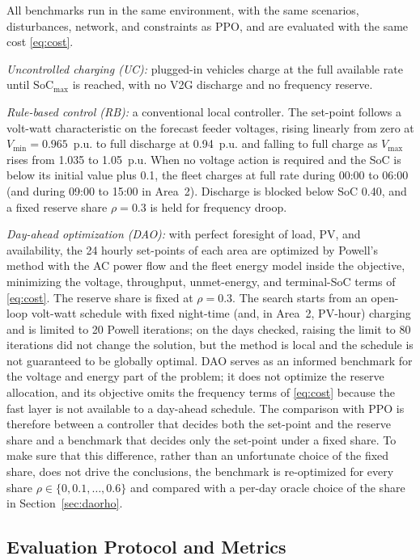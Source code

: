 All benchmarks run in the same environment, with the same scenarios,
disturbances, network, and constraints as PPO, and are evaluated with
the same cost \eqref{eq:cost}.

\emph{Uncontrolled charging (UC):} plugged-in vehicles charge at the
full available rate until $\mathrm{SoC}_{\max}$ is reached, with no V2G
discharge and no frequency reserve.

\emph{Rule-based control (RB):} a conventional local controller. The
set-point follows a volt-watt characteristic on the forecast feeder
voltages, rising linearly from zero at $V_{\min}=0.965$~p.u. to full
discharge at 0.94~p.u. and falling to full charge as $V_{\max}$ rises
from 1.035 to 1.05~p.u. When no voltage action is required and the SoC
is below its initial value plus 0.1, the fleet charges at full rate
during 00:00 to 06:00 (and during 09:00 to 15:00 in Area~2). Discharge
is blocked below SoC 0.40, and a fixed reserve share $\rho=0.3$ is
held for frequency droop.

\emph{Day-ahead optimization (DAO):} with perfect foresight of load,
PV, and availability, the 24 hourly set-points of each area are
optimized by Powell's method with the AC power flow and the fleet
energy model inside the objective, minimizing the voltage, throughput,
unmet-energy, and terminal-SoC terms of \eqref{eq:cost}. The reserve
share is fixed at $\rho=0.3$. The search starts from an open-loop
volt-watt schedule with fixed night-time (and, in Area~2, PV-hour)
charging and is limited to 20 Powell iterations; on the days checked,
raising the limit to 80 iterations did not change the solution, but
the method is local and the schedule is not guaranteed to be globally
optimal. DAO serves as an informed benchmark for the voltage and
energy part of the problem; it does not optimize the reserve
allocation, and its objective omits the frequency terms of
\eqref{eq:cost} because the fast layer is not available to a
day-ahead schedule. The comparison with PPO is therefore between a
controller that decides both the set-point and the reserve share and
a benchmark that decides only the set-point under a fixed share. To
make sure that this difference, rather than an unfortunate choice of
the fixed share, does not drive the conclusions, the benchmark is
re-optimized for every share $\rho\in\{0,0.1,\dots,0.6\}$ and compared
with a per-day oracle choice of the share in
Section~\ref{sec:daorho}.

\subsection{Evaluation Protocol and Metrics}
\label{sec:protocol}

